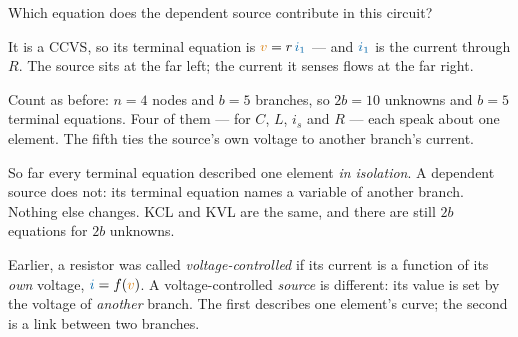 \documentclass[11pt,a4paper]{article}
\newcommand{\Icol}[1]{\textcolor{ccur}{#1}}
\newcommand{\Vcol}[1]{\textcolor{cvolt}{#1}}
\begin{document}
\begin{examplebox}
Which equation does the dependent source contribute in this circuit?

\begin{minipage}[c]{0.56\linewidth}
\centering
{}
\end{minipage}\hfill
\begin{minipage}[c]{0.41\linewidth}
It is a CCVS, so its terminal equation is $\Vcol{v} = r\,\Icol{i_1}$ --- and $\Icol{i_1}$
is the current through $R$. The source sits at the far left; the current it senses flows
at the far right.
\end{minipage}

Count as before: $n = 4$ nodes and $b = 5$ branches, so $2b = 10$ unknowns and
$b = 5$ terminal equations. Four of them --- for $C$, $L$, $i_s$ and $R$ --- each speak about one element. The
fifth ties the source's own voltage to another branch's current.
\end{examplebox}

\begin{ideabox}
So far every terminal equation described one element \emph{in isolation}. A dependent
source does not: its terminal equation names a variable of another branch. Nothing else
changes. KCL and KVL are the same, and there are still $2b$ equations for $2b$ unknowns.
\end{ideabox}

\begin{cautionbox}
Earlier, a resistor was called \emph{voltage-controlled} if its current is a function of its
\emph{own} voltage, $\Icol{i} = f(\Vcol{v})$. A voltage-controlled \emph{source} is
different: its value is set by the voltage of \emph{another} branch. The first describes
one element's curve; the second is a link between two branches.
\end{cautionbox}
\end{document}
